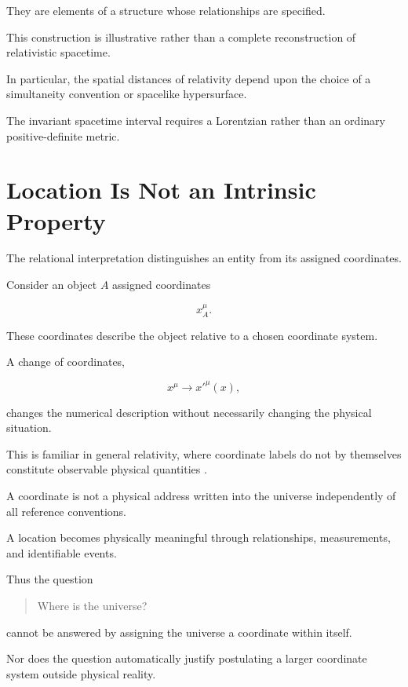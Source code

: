 \documentclass[12pt,onecolumn]{article}
\begin{document}
They are elements of a structure whose
relationships are specified.

This construction is illustrative rather
than a complete reconstruction of relativistic
spacetime.

In particular, the spatial distances of
relativity depend upon the choice of a
simultaneity convention or spacelike
hypersurface.

The invariant spacetime interval requires
a Lorentzian rather than an ordinary
positive-definite metric.

\section{Location Is Not an Intrinsic Property}

The relational interpretation distinguishes
an entity from its assigned coordinates.

Consider an object $A$ assigned coordinates

\begin{equation}
x^\mu_A.
\end{equation}

These coordinates describe the object relative
to a chosen coordinate system.

A change of coordinates,

\begin{equation}
x^\mu \longrightarrow x'^\mu(x),
\end{equation}

changes the numerical description without
necessarily changing the physical situation.

This is familiar in general relativity,
where coordinate labels do not by themselves
constitute observable physical quantities
\citep{einstein1916,wald1984}.

A coordinate is not a physical address
written into the universe independently
of all reference conventions.

A location becomes physically meaningful
through relationships, measurements,
and identifiable events.

Thus the question

\begin{quote}
Where is the universe?
\end{quote}

cannot be answered by assigning the universe
a coordinate within itself.

Nor does the question automatically justify
postulating a larger coordinate system
outside physical reality.
\end{document}
